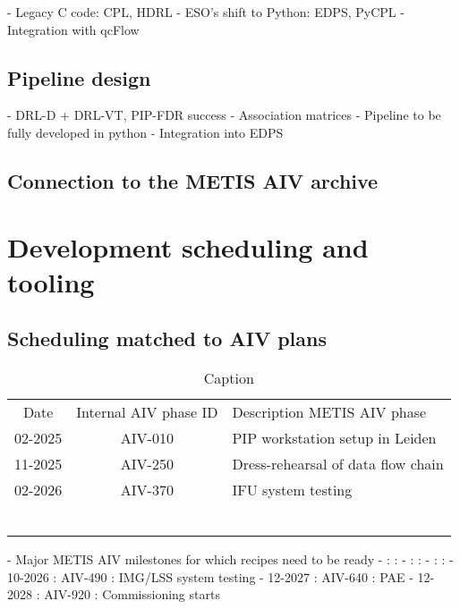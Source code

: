 \documentclass[]{spie}  %
\begin{document}
	- Legacy C code: CPL, HDRL
	- ESO's shift to Python: EDPS, PyCPL
	- Integration with qcFlow

\subsection{Pipeline design}
\label{ssec:imp_pip}

	- DRL-D + DRL-VT, PIP-FDR success
	- Association matrices
	- Pipeline to be fully developed in python 
	- Integration into EDPS
 
\subsection{Connection to the METIS AIV archive}
\label{ssec:imp_archive}


\section{Development scheduling and tooling}
\label{sec:development}

\subsection{Scheduling matched to AIV plans}
\label{ssec:dev_aiv}

\begin{table}[]
    \centering
\caption{Caption}
\label{tab:dev_aiv_milestones}
    \begin{tabular}{c|cl}
         Date&   Internal AIV phase ID&Description METIS AIV phase\\
         02-2025&   AIV-010&PIP workstation setup in Leiden\\
         11-2025&   AIV-250&Dress-rehearsal of data flow chain\\
 02-2026& AIV-370&IFU system testing\\
 &  &\\
 & &\\
 & &\\
 & &\\
 & &\\
 & &\\
 \end{tabular}
   
   
\end{table}


 - Major METIS AIV milestones for which recipes need to be ready
		-  :  : 
		-  :  : 
		-  :  : 
		- 10-2026 : AIV-490 : IMG/LSS system testing
		- 12-2027 : AIV-640 : PAE
		- 12-2028 : AIV-920 : Commissioning starts
\end{document}
